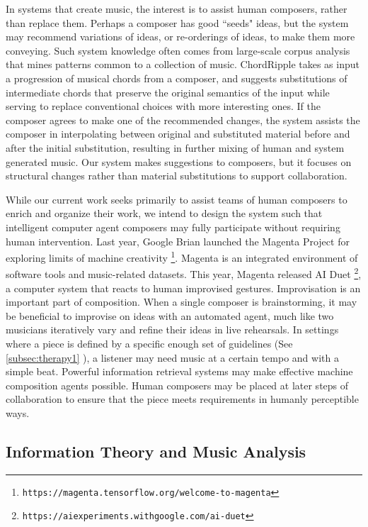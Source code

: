 \documentclass[final,authoryear,5p,times,twocolumn]{elsarticle}
\begin{document}
In systems that create music, the interest is to assist human composers, rather than replace them. Perhaps a composer has good ``seeds" ideas, but the system may recommend variations of ideas, or re-orderings of ideas, to make them more conveying. Such system knowledge often comes from large-scale corpus analysis that mines patterns common to a collection of music. ChordRipple \citep{huang2016chordripple} takes as input a progression of musical chords from a composer, and suggests substitutions of intermediate chords that preserve the original semantics of the input while serving to replace conventional choices with more interesting ones. If the composer agrees to make one of the recommended changes, the system assists the composer in interpolating between original and substituted material before and after the initial substitution, resulting in further mixing of human and system generated music. Our system makes suggestions to composers, but it focuses on structural changes rather than material substitutions to support collaboration.

While our current work seeks primarily to assist teams of human composers to enrich and organize their work, we intend to design the system such that intelligent computer agent composers may fully participate without requiring human intervention. Last year, Google Brian launched the Magenta Project for exploring limits of machine creativity \footnote{\texttt{https://magenta.tensorflow.org/welcome-to-magenta}}. Magenta is an integrated environment of software tools and music-related datasets. This year, Magenta released AI Duet \footnote{\texttt{https://aiexperiments.withgoogle.com/ai-duet}}, a computer system that reacts to human improvised gestures. Improvisation is an important part of composition. When a single composer is brainstorming, it may be beneficial to improvise on ideas with an automated agent, much like two musicians iteratively vary and refine their ideas in live rehearsals. In settings where a piece is defined by a specific enough set of guidelines (See \ref{subsec:therapy1} ), a listener may need music at a certain tempo and with a simple beat. Powerful information retrieval systems may make effective machine composition agents possible. Human composers may be placed at later steps of collaboration to ensure that the piece meets requirements in humanly perceptible ways.

\subsection{Information Theory and Music Analysis}
\end{document}
